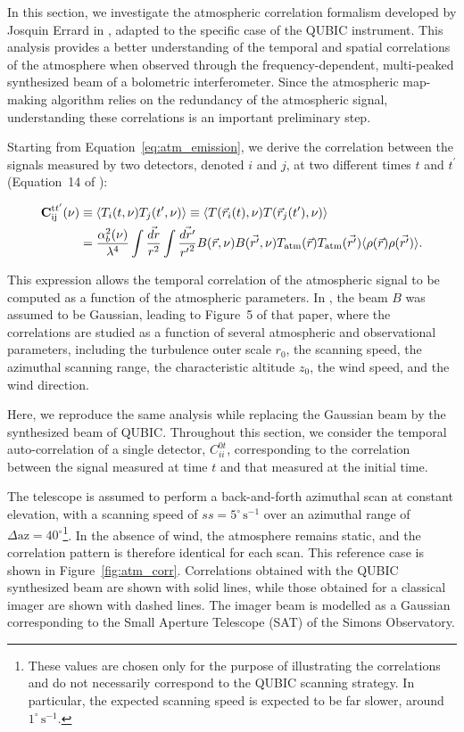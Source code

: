 \documentclass[../../thesis.tex]{subfiles}
\begin{document}
In this section, we investigate the atmospheric correlation formalism developed by Josquin Errard in \cite{errard2015}, adapted to the specific case of the QUBIC instrument. This analysis provides a better understanding of the temporal and spatial correlations of the atmosphere when observed through the frequency-dependent, multi-peaked synthesized beam of a bolometric interferometer. Since the atmospheric map-making algorithm relies on the redundancy of the atmospheric signal, understanding these correlations is an important preliminary step.

Starting from Equation~\ref{eq:atm_emission}, we derive the correlation between the signals measured by two detectors, denoted $i$ and $j$, at two different times $t$ and $t^\prime$ (Equation~14 of \cite{errard2015}):

\begin{align}
    \textbf{C}_\text{ij}^\text{t$t^\prime$} (\nu) &\equiv \langle T_i(t, \nu) T_j(t^\prime, \nu) \rangle \equiv \langle T(\vec{r}_i(t), \nu) T(\vec{r}_j(t^\prime), \nu) \rangle \notag \\ 
    &= \frac{\alpha_b^2(\nu)}{\lambda^4} \int\frac{\vec{dr}}{r^2} \int\frac{\vec{dr^\prime}}{{r^\prime}^2} B(\vec{r}, \nu) B(\vec{r^\prime}, \nu) T_\text{atm}(\vec{r}) T_\text{atm}(\vec{r^\prime}) \langle \rho(\vec{r}) \rho(\vec{r^\prime}) \rangle .
\end{align}

This expression allows the temporal correlation of the atmospheric signal to be computed as a function of the atmospheric parameters. In \cite{errard2015}, the beam $B$ was assumed to be Gaussian, leading to Figure~5 of that paper, where the correlations are studied as a function of several atmospheric and observational parameters, including the turbulence outer scale $r_0$, the scanning speed, the azimuthal scanning range, the characteristic altitude $z_0$, the wind speed, and the wind direction.

Here, we reproduce the same analysis while replacing the Gaussian beam by the synthesized beam of QUBIC. Throughout this section, we consider the temporal auto-correlation of a single detector, $C_{ii}^{0t}$, corresponding to the correlation between the signal measured at time $t$ and that measured at the initial time.

The telescope is assumed to perform a back-and-forth azimuthal scan at constant elevation, with a scanning speed of $ss = 5^\circ\,\mathrm{s}^{-1}$ over an azimuthal range of $\Delta \text{az} = 40^\circ$\footnote{These values are chosen only for the purpose of illustrating the correlations and do not necessarily correspond to the QUBIC scanning strategy. In particular, the expected scanning speed is expected to be far slower, around $1^\circ\,\mathrm{s}^{-1}$.}. In the absence of wind, the atmosphere remains static, and the correlation pattern is therefore identical for each scan. This reference case is shown in Figure~\ref{fig:atm_corr}. Correlations obtained with the QUBIC synthesized beam are shown with solid lines, while those obtained for a classical imager are shown with dashed lines. The imager beam is modelled as a Gaussian corresponding to the Small Aperture Telescope (SAT) of the Simons Observatory.
\end{document}
